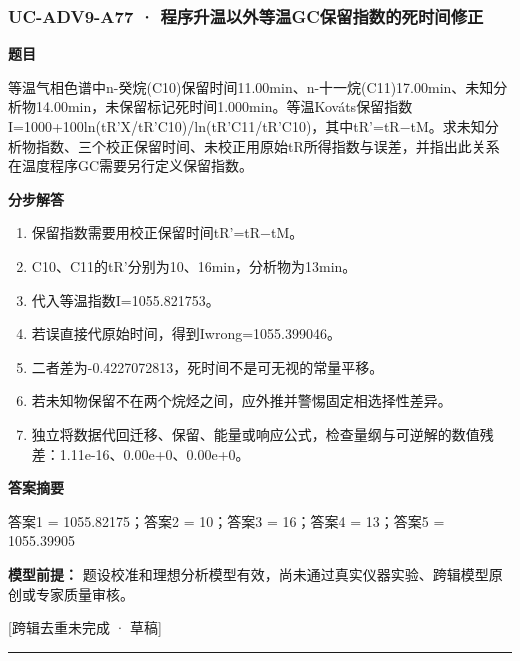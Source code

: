 \documentclass[UTF8,11pt,a4paper]{ctexart}
\begin{document}
\subsubsection*{UC-ADV9-A77 · 程序升温以外等温GC保留指数的死时间修正}
\noindent\textbf{题目}\par
等温气相色谱中n-癸烷(C10)保留时间11.00min、n-十一烷(C11)17.00min、未知分析物14.00min，未保留标记死时间1.000min。等温Kováts保留指数I=1000+100ln(tR'X/tR'C10)/ln(tR'C11/tR'C10)，其中tR'=tR−tM。求未知分析物指数、三个校正保留时间、未校正用原始tR所得指数与误差，并指出此关系在温度程序GC需要另行定义保留指数。\par
\medskip\noindent\textbf{分步解答}
\begin{enumerate}
\item 保留指数需要用校正保留时间tR'=tR−tM。
\item C10、C11的tR'分别为10、16min，分析物为13min。
\item 代入等温指数I=1055.821753。
\item 若误直接代原始时间，得到Iwrong=1055.399046。
\item 二者差为-0.4227072813，死时间不是可无视的常量平移。
\item 若未知物保留不在两个烷烃之间，应外推并警惕固定相选择性差异。
\item 独立将数据代回迁移、保留、能量或响应公式，检查量纲与可逆解的数值残差：1.11e-16、0.00e+0、0.00e+0。
\end{enumerate}
\noindent\textbf{答案摘要}\par
答案1 = 1055.82175；答案2 = 10；答案3 = 16；答案4 = 13；答案5 = 1055.39905\par
\noindent\textbf{模型前提：}
题设校准和理想分析模型有效，尚未通过真实仪器实验、跨辑模型原创或专家质量审核。\par
\noindent\textcolor{red!65!black}{[跨辑去重未完成 · 草稿]} \par
\medskip\hrule\medskip
{}
\end{document}
